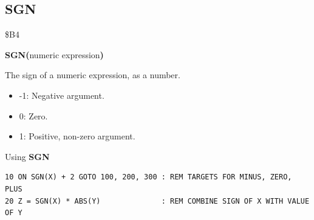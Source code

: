 \subsection{SGN}
\begin{description}[leftmargin=2cm,style=nextline]
\item [Token:]    \$B4

\item [Format:]   {\bf SGN(}numeric expression{\bf)}

\item [Returns:]  The sign of a numeric expression, as a number.

                  \begin{itemize}
                     \item -1: Negative argument.
                     \item 0: Zero.
                     \item 1: Positive, non-zero argument.
                  \end{itemize}

\item [Example:]  Using {\bf SGN}

\begin{tcolorbox}[colback=black,coltext=white]
\verbatimfont{\codefont}
\begin{verbatim}
10 ON SGN(X) + 2 GOTO 100, 200, 300 : REM TARGETS FOR MINUS, ZERO, PLUS
20 Z = SGN(X) * ABS(Y)              : REM COMBINE SIGN OF X WITH VALUE OF Y
\end{verbatim}
\end{tcolorbox}
\end{description}


\newpage
